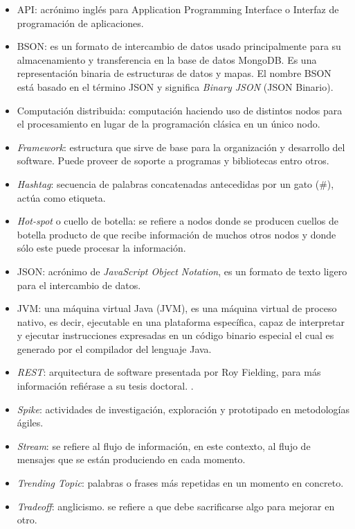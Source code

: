 \begin{glosario}

\begin{itemize}
\item API: acrónimo inglés para Application Programming Interface o Interfaz de programación de aplicaciones.
\item BSON: es un formato de intercambio de datos usado principalmente para su almacenamiento y transferencia en la base de datos MongoDB. Es una representación binaria de estructuras de datos y mapas. El nombre BSON está basado en el término JSON y significa \textit{Binary JSON} (JSON Binario).
\item Computación distribuida: computación haciendo uso de distintos nodos para el procesamiento en lugar de la programación clásica en un único nodo.
\item \textit{Framework}: estructura que sirve de base para la organización y desarrollo del software. Puede proveer de soporte a programas y bibliotecas entro otros.
\item \textit{Hashtag}: secuencia de palabras concatenadas antecedidas por un gato (\#), actúa como etiqueta.
\item \textit{Hot-spot} o cuello de botella: se refiere a nodos donde se producen cuellos de botella producto de que recibe información de muchos otros nodos y donde sólo este puede procesar la información.
\item JSON: acrónimo de \textit{JavaScript Object Notation}, es un formato de texto ligero para el intercambio de datos.
\item JVM: una máquina virtual Java (JVM), es una máquina virtual de proceso nativo, es decir, ejecutable en una plataforma específica, capaz de interpretar y ejecutar instrucciones expresadas en un código binario especial el cual es generado por el compilador del lenguaje Java.
\item \textit{REST}: arquitectura de software presentada por Roy Fielding, para más información refiérase a su tesis doctoral. \cite{Fielding}.
\item \textit{Spike}: actividades de investigación, exploración y prototipado en metodologías ágiles.
\item \textit{Stream}: se refiere al flujo de información, en este contexto, al flujo de mensajes que se están produciendo en cada momento.
\item \textit{Trending Topic}: palabras o frases más repetidas en un momento en concreto.
\item \textit{Tradeoff}: anglicismo. se refiere a que debe sacrificarse algo para mejorar en otro.

\end{itemize}
\end{glosario}
